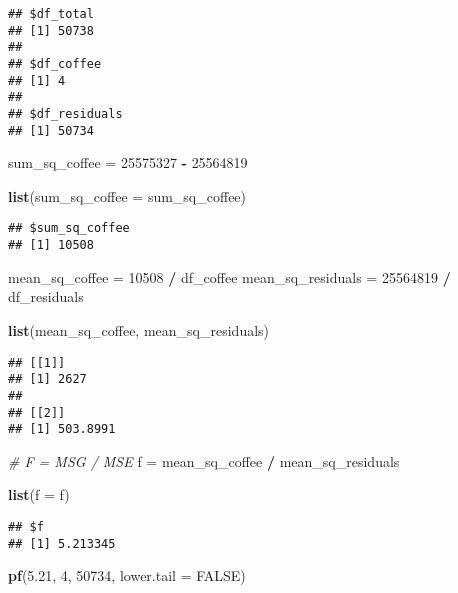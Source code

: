 \documentclass[]{book}
\newenvironment{Shaded}{\begin{snugshade}}{\end{snugshade}}
\newcommand{\CommentTok}[1]{\textcolor[rgb]{0.56,0.35,0.01}{\textit{#1}}}
\newcommand{\DataTypeTok}[1]{\textcolor[rgb]{0.13,0.29,0.53}{#1}}
\newcommand{\DecValTok}[1]{\textcolor[rgb]{0.00,0.00,0.81}{#1}}
\newcommand{\FloatTok}[1]{\textcolor[rgb]{0.00,0.00,0.81}{#1}}
\newcommand{\KeywordTok}[1]{\textcolor[rgb]{0.13,0.29,0.53}{\textbf{#1}}}
\newcommand{\NormalTok}[1]{#1}
\newcommand{\OperatorTok}[1]{\textcolor[rgb]{0.81,0.36,0.00}{\textbf{#1}}}
\newcommand{\OtherTok}[1]{\textcolor[rgb]{0.56,0.35,0.01}{#1}}
\newcommand{\StringTok}[1]{\textcolor[rgb]{0.31,0.60,0.02}{#1}}
\begin{document}
\begin{verbatim}
## $df_total
## [1] 50738
## 
## $df_coffee
## [1] 4
## 
## $df_residuals
## [1] 50734
\end{verbatim}

\begin{Shaded}
\begin{Highlighting}[]
\NormalTok{sum_sq_coffee =}\StringTok{ }\DecValTok{25575327} \OperatorTok{-}\StringTok{ }\DecValTok{25564819}

\KeywordTok{list}\NormalTok{(}\DataTypeTok{sum_sq_coffee =}\NormalTok{ sum_sq_coffee)}
\end{Highlighting}
\end{Shaded}

\begin{verbatim}
## $sum_sq_coffee
## [1] 10508
\end{verbatim}

\begin{Shaded}
\begin{Highlighting}[]
\NormalTok{mean_sq_coffee =}\StringTok{ }\DecValTok{10508} \OperatorTok{/}\StringTok{ }\NormalTok{df_coffee}
\NormalTok{mean_sq_residuals =}\StringTok{ }\DecValTok{25564819} \OperatorTok{/}\StringTok{ }\NormalTok{df_residuals}

\KeywordTok{list}\NormalTok{(mean_sq_coffee, mean_sq_residuals)}
\end{Highlighting}
\end{Shaded}

\begin{verbatim}
## [[1]]
## [1] 2627
## 
## [[2]]
## [1] 503.8991
\end{verbatim}

\begin{Shaded}
\begin{Highlighting}[]
\CommentTok{# F = MSG / MSE}
\NormalTok{f =}\StringTok{ }\NormalTok{mean_sq_coffee }\OperatorTok{/}\StringTok{ }\NormalTok{mean_sq_residuals}

\KeywordTok{list}\NormalTok{(}\DataTypeTok{f =}\NormalTok{ f)}
\end{Highlighting}
\end{Shaded}

\begin{verbatim}
## $f
## [1] 5.213345
\end{verbatim}

\begin{Shaded}
\begin{Highlighting}[]
\KeywordTok{pf}\NormalTok{(}\FloatTok{5.21}\NormalTok{, }\DecValTok{4}\NormalTok{, }\DecValTok{50734}\NormalTok{, }\DataTypeTok{lower.tail =} \OtherTok{FALSE}\NormalTok{)}
\end{Highlighting}
\end{Shaded}
\end{document}
